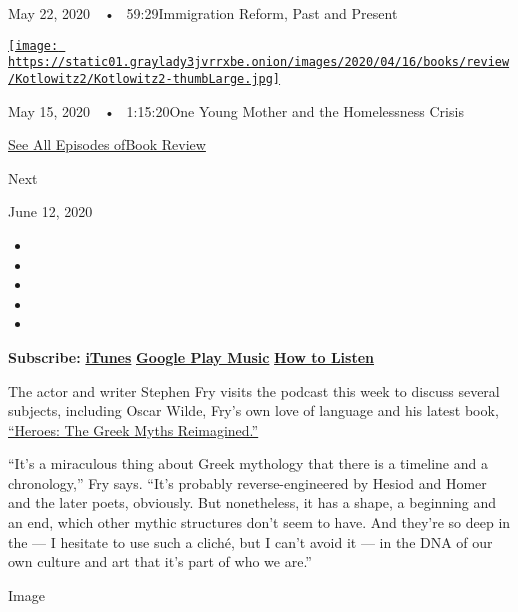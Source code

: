 May 22, 2020~~•~ 59:29Immigration Reform, Past and Present

\href{https://www.nytimes3xbfgragh.onion/2020/05/15/books/review/podcast-lauren-sandler-this-is-all-i-got-sarah-weinman-crime-fiction.html?action=click\&module=audio-series-bar\&region=header\&pgtype=Article}{\texttt{[image: https://static01.graylady3jvrrxbe.onion/images/2020/04/16/books/review/Kotlowitz2/Kotlowitz2-thumbLarge.jpg]}}

May 15, 2020~~•~ 1:15:20One Young Mother and the Homelessness Crisis

\href{https://www.nytimes3xbfgragh.onion/column/book-review-podcast}{See
All Episodes ofBook Review}

Next

June 12, 2020

\begin{itemize}
\item
\item
\item
\item
\item
\end{itemize}

\textbf{Subscribe:}
\textbf{\href{https://itunes.apple.com/us/podcast/book-review/id120315179?mt=2}{iTunes}}
\textbf{\textbar{}}
\textbf{\href{https://play.google.com/music/listen?u=0\#/ps/Iv6zeb5qwjtzjfbyo3vy5zny5ky}{Google
Play Music}} \textbf{\textbar{}}
\textbf{\href{https://www.nytimes3xbfgragh.onion/2018/08/03/books/review/how-to-listen-to-the-book-review-podcast.html}{How
to Listen}}

The actor and writer Stephen Fry visits the podcast this week to discuss
several subjects, including Oscar Wilde, Fry's own love of language and
his latest book,
\href{https://www.chroniclebooks.com/products/heroes}{``Heroes: The
Greek Myths Reimagined.''}

``It's a miraculous thing about Greek mythology that there is a timeline
and a chronology,'' Fry says. ``It's probably reverse-engineered by
Hesiod and Homer and the later poets, obviously. But nonetheless, it has
a shape, a beginning and an end, which other mythic structures don't
seem to have. And they're so deep in the --- I hesitate to use such a
cliché, but I can't avoid it --- in the DNA of our own culture and art
that it's part of who we are.''

Image

